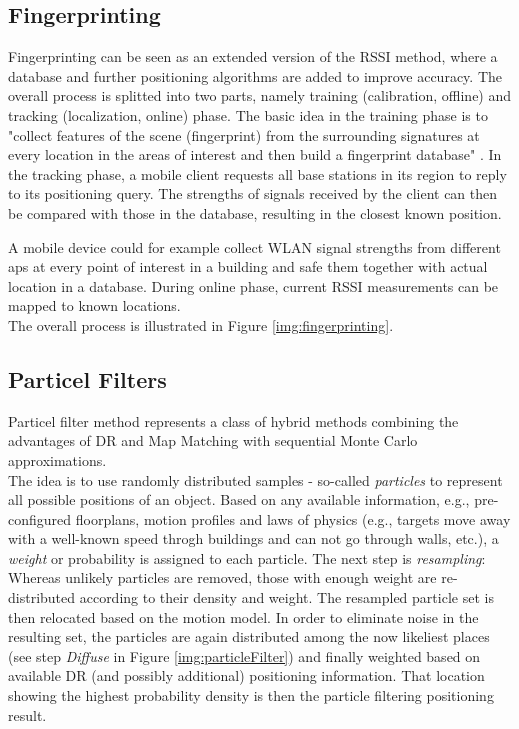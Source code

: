 \subsection*{Fingerprinting}

Fingerprinting can be seen as an extended version of the RSSI method, where a database and further positioning algorithms are added to improve accuracy. 
The overall process is splitted into two parts, namely training (calibration, offline) and tracking (localization, online) phase.
The basic idea in the training phase is to "collect features of the scene (fingerprint) from the surrounding signatures at every location in the areas of interest and then build a fingerprint database" \cite{recentAdvances}. 
In the tracking phase, a mobile client requests all base stations in its region to reply to its positioning query. The strengths of signals received by the client can then be compared with those in the database, resulting in the closest known position.

A mobile device could for example collect WLAN signal strengths from different \ac{ap}s at every point of interest in a building and safe them together with actual location in a database. During online phase, current RSSI measurements can be mapped to known locations.\\
The overall process is illustrated in Figure \ref{img:fingerprinting}.


\subsection*{Particel Filters}
Particel filter method represents a class of hybrid methods combining the advantages of DR and Map Matching with sequential Monte Carlo approximations.\cite{particleFilter}\\
The idea is to use randomly distributed samples - so-called \textit{particles} to represent all possible positions of an object. Based on any available information, e.g., pre-configured floorplans, motion profiles and laws of physics (e.g., targets move away with a well-known speed throgh buildings and can not go through walls, etc.), a \textit{weight} or probability is assigned to each particle. The next step is \textit{resampling}: Whereas unlikely particles are removed, those with enough weight are re-distributed according to their density and weight.
The resampled particle set is then relocated based on the motion model. In order to eliminate noise in the resulting set, the particles are again distributed among the now likeliest places (see step \emph{Diffuse} in Figure \ref{img:particleFilter}) and finally weighted based on available DR (and possibly additional) positioning information.
That location showing the highest probability density is then the particle filtering positioning result.\\

